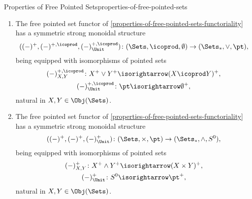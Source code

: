\begin{proposition}{Properties of Free Pointed Sets}{properties-of-free-pointed-sets}
\begin{enumerate}
        \item\label{properties-of-free-pointed-sets-symmetric-strong-monoidality-with-respect-to-wedge-sums}The free pointed set functor of \cref{properties-of-free-pointed-sets-functoriality} has a symmetric strong monoidal structure
            \[
                ((-)^{+},(-)^{+,\icoprod},(-)^{+,\icoprod}_{\Unit})
                \colon
                (\Sets,\icoprod,\emptyset)
                \to
                (\Sets_{*},\vee,\pt),
            \]%
            being equipped with isomorphisms of pointed sets%
            \[
                \begin{gathered}
                    (-)^{+,\icoprod}_{X,Y}   \colon X^{+}\vee Y^{+} \isorightarrow (X\icoprod Y)^{+},\\
                    (-)^{+,\icoprod}_{\Unit} \colon \pt             \isorightarrow \emptyset^{+},
                \end{gathered}
            \]%
            natural in $X,Y\in\Obj(\Sets)$.
        \item\label{properties-of-free-pointed-sets-symmetric-strong-monoidality-with-respect-to-smash-products}The free pointed set functor of \cref{properties-of-free-pointed-sets-functoriality} has a symmetric strong monoidal structure
            \[
                ((-)^{+},(-)^{+},(-)^{+}_{\Unit})
                \colon
                (\Sets,\times,\pt)
                \to
                (\Sets_{*},\wedge,S^{0}),
            \]%
            being equipped with isomorphisms of pointed sets%
            \[
                \begin{gathered}
                    (-)^{+}_{X,Y}   \colon X^{+}\wedge Y^{+} \isorightarrow (X\times Y)^{+},\\
                    (-)^{+}_{\Unit} \colon S^{0}             \isorightarrow \pt^{+},
                \end{gathered}
            \]%
            natural in $X,Y\in\Obj(\Sets)$.
    \end{enumerate}
\end{proposition}
